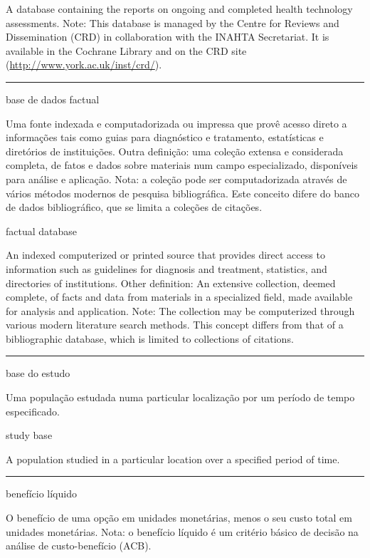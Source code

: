 \documentclass[
]{book}
\begin{document}
A database containing the reports on ongoing and completed health technology assessments. Note: This database is managed by the Centre for Reviews and Dissemination (CRD) in collaboration with the INAHTA Secretariat. It is available in the Cochrane Library and on the CRD site (\url{http://www.york.ac.uk/inst/crd/}).

\begin{center}\rule{0.5\linewidth}{0.5pt}\end{center}

base de dados factual

Uma fonte indexada e computadorizada ou impressa que provê acesso direto a informações tais como guias para diagnóstico e tratamento, estatísticas e diretórios de instituições. Outra definição: uma coleção extensa e considerada completa, de fatos e dados sobre materiais num campo especializado, disponíveis para análise e aplicação. Nota: a coleção pode ser computadorizada através de vários métodos modernos de pesquisa bibliográfica. Este conceito difere do banco de dados bibliográfico, que se limita a coleções de citações.

factual database

An indexed computerized or printed source that provides direct access to information such as guidelines for diagnosis and treatment, statistics, and directories of institutions. Other definition: An extensive collection, deemed complete, of facts and data from materials in a specialized field, made available for analysis and application. Note: The collection may be computerized through various modern literature search methods. This concept differs from that of a bibliographic database, which is limited to collections of citations.

\begin{center}\rule{0.5\linewidth}{0.5pt}\end{center}

base do estudo

Uma população estudada numa particular localização por um período de tempo especificado.

study base

A population studied in a particular location over a specified period of time.

\begin{center}\rule{0.5\linewidth}{0.5pt}\end{center}

benefício líquido

O benefício de uma opção em unidades monetárias, menos o seu custo total em unidades monetárias. Nota: o benefício líquido é um critério básico de decisão na análise de custo-benefício (ACB).
\end{document}
